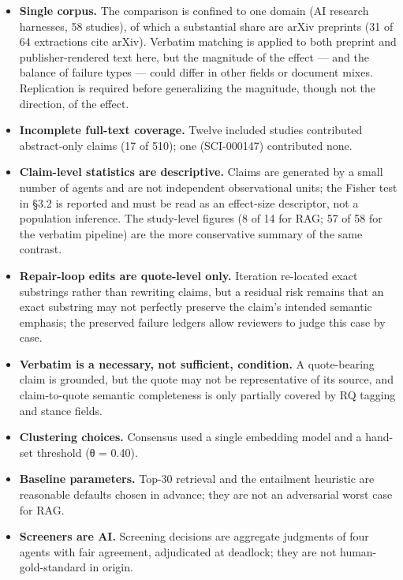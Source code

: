 \documentclass[11pt]{article}
\newcounter{none} %
\providecommand{\tightlist}{%
  \setlength{\itemsep}{0pt}\setlength{\parskip}{0pt}}
\begin{document}
\begin{itemize}
\tightlist
\item
  \textbf{Single corpus.} The comparison is confined to one domain (AI
  research harnesses, 58 studies), of which a substantial share are
  arXiv preprints (31 of 64 extractions cite arXiv). Verbatim matching
  is applied to both preprint and publisher-rendered text here, but the
  magnitude of the effect --- and the balance of failure types --- could
  differ in other fields or document mixes. Replication is required
  before generalizing the magnitude, though not the direction, of the
  effect.
\item
  \textbf{Incomplete full-text coverage.} Twelve included studies
  contributed abstract-only claims (17 of 510); one (SCI-000147)
  contributed none.
\item
  \textbf{Claim-level statistics are descriptive.} Claims are generated
  by a small number of agents and are not independent observational
  units; the Fisher test in §3.2 is reported and must be read as an
  effect-size descriptor, not a population inference. The study-level
  figures (8 of 14 for RAG; 57 of 58 for the verbatim pipeline) are the
  more conservative summary of the same contrast.
\item
  \textbf{Repair-loop edits are quote-level only.} Iteration re-located
  exact substrings rather than rewriting claims, but a residual risk
  remains that an exact substring may not perfectly preserve the claim's
  intended semantic emphasis; the preserved failure ledgers allow
  reviewers to judge this case by case.
\item
  \textbf{Verbatim is a necessary, not sufficient, condition.} A
  quote-bearing claim is grounded, but the quote may not be
  representative of its source, and claim-to-quote semantic completeness
  is only partially covered by RQ tagging and stance fields.
\item
  \textbf{Clustering choices.} Consensus used a single embedding model
  and a hand-set threshold (θ = 0.40).
\item
  \textbf{Baseline parameters.} Top-30 retrieval and the entailment
  heuristic are reasonable defaults chosen in advance; they are not an
  adversarial worst case for RAG.
\item
  \textbf{Screeners are AI.} Screening decisions are aggregate judgments
  of four agents with fair agreement, adjudicated at deadlock; they are
  not human-gold-standard in origin.
\end{itemize}
\end{document}
